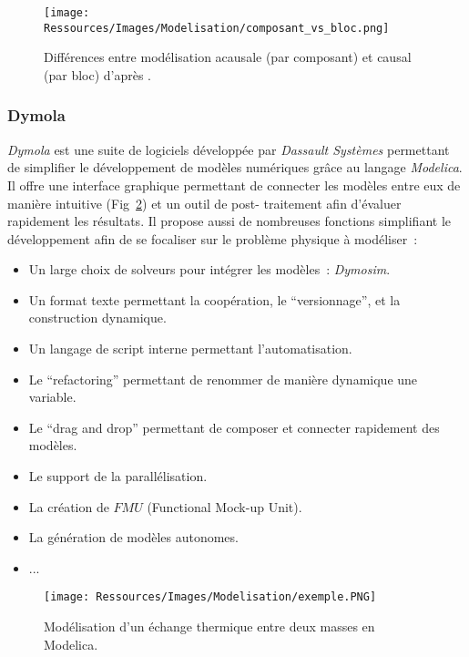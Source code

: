 \begin{figure}
    \begin{center}
        \texttt{[image: Ressources/Images/Modelisation/composant\_vs\_bloc.png]}
    \end{center}
    \caption{Différences entre modélisation acausale (par composant) et causal (par bloc)
             d’après .
             \label{fig:acausal_vs_causal}}
\end{figure}

\subsubsection{Dymola} %
\label{ssub:dymola}
\emph{Dymola} est une suite de logiciels développée par \emph{Dassault Systèmes}
permettant de simplifier le développement de modèles numériques grâce au langage
\emph{Modelica}. Il offre une interface graphique permettant de connecter les modèles
entre eux de manière intuitive (Fig~\ref{fig:exemple_modelica}) et un outil de post-
traitement afin d’évaluer rapidement les résultats. Il propose aussi de nombreuses fonctions
simplifiant le développement afin de se focaliser sur le problème physique à modéliser~:
\begin{itemize}
    \item Un large choix de solveurs pour intégrer les modèles~: \emph{Dymosim}.
    \item Un format texte permettant la coopération, le \enquote{versionnage}, et la construction dynamique.
    \item Un langage de script interne permettant l’automatisation.
    \item Le \enquote{refactoring} permettant de renommer de manière dynamique une variable.
    \item Le \enquote{drag and drop} permettant de composer et connecter rapidement des modèles.
    \item Le support de la parallélisation.
    \item La création de $FMU$ (Functional Mock-up Unit).
    \item La génération de modèles autonomes.
    \item ...
\end{itemize}

\begin{figure}
    \begin{center}
        \texttt{[image: Ressources/Images/Modelisation/exemple.PNG]}
    \end{center}
    \caption{Modélisation d’un échange thermique entre deux masses en Modelica.
             \label{fig:exemple_modelica}}
\end{figure}


